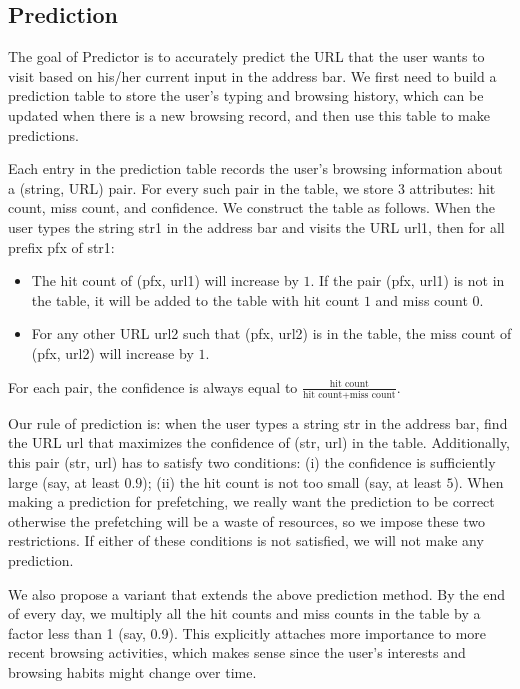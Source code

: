 \subsection{Prediction}

The goal of Predictor is to accurately predict the URL that the user wants to visit based on his/her current input in the address bar. We first need to build a prediction table to store the user's typing and browsing history, which can be updated when there is a new browsing record, and then use this table to make predictions.

Each entry in the prediction table records the user's browsing information about a (string, URL) pair. For every such pair in the table, we store 3 attributes: hit count, miss count, and confidence. We construct the table as follows. When the user types the string \textsf{str1} in the address bar and visits the URL \textsf{url1}, then for all prefix \textsf{pfx} of \textsf{str1}:
\begin{itemize}
	\item The hit count of (\textsf{pfx}, \textsf{url1}) will increase by $1$. If the pair (\textsf{pfx}, \textsf{url1}) is not in the table, it will be added to the table with hit count $1$ and miss count $0$.
	\item For any other URL \textsf{url2} such that (\textsf{pfx}, \textsf{url2}) is in the table, the miss count of (\textsf{pfx}, \textsf{url2}) will increase by $1$.
\end{itemize}
For each pair, the confidence is always equal to $\frac{\text{hit count}}{\text{hit count} + \text{miss count}}$.

Our rule of prediction is: when the user types a string \textsf{str} in the address bar, find the URL \textsf{url} that maximizes the confidence of (\textsf{str}, \textsf{url}) in the table. Additionally, this pair (\textsf{str}, \textsf{url}) has to satisfy two conditions: (i) the confidence is sufficiently large (say, at least $0.9$); (ii) the hit count is not too small (say, at least $5$).
When making a prediction for prefetching, we really want the prediction to be correct otherwise the prefetching will be a waste of resources, so we impose these two restrictions. If either of these conditions is not satisfied, we will not make any prediction.

We also propose a variant that extends the above prediction method. By the end of every day, we multiply all the hit counts and miss counts in the table by a factor less than 1 (say, 0.9). This explicitly attaches more importance to more recent browsing activities, which makes sense since the user's interests and browsing habits might change over time.



